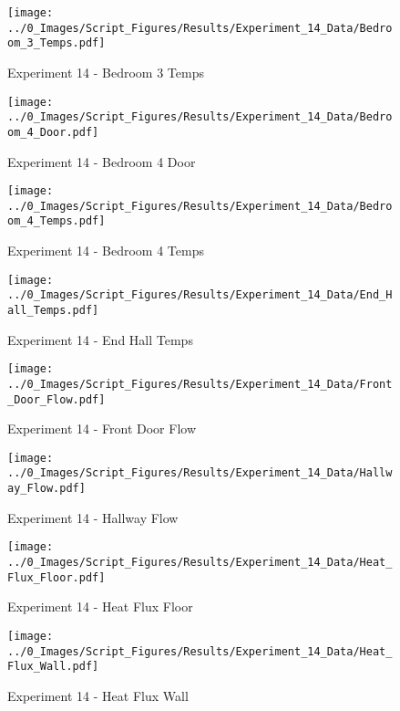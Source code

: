 	\begin{figure}[H]
		\centering
		\texttt{[image: ../0\_Images/Script\_Figures/Results/Experiment\_14\_Data/Bedroom\_3\_Temps.pdf]}
		\caption[]{Experiment 14 - Bedroom 3 Temps}
	\end{figure}
 
	\clearpage

	\begin{figure}[H]
		\centering
		\texttt{[image: ../0\_Images/Script\_Figures/Results/Experiment\_14\_Data/Bedroom\_4\_Door.pdf]}
		\caption[]{Experiment 14 - Bedroom 4 Door}
	\end{figure}
 

	\begin{figure}[H]
		\centering
		\texttt{[image: ../0\_Images/Script\_Figures/Results/Experiment\_14\_Data/Bedroom\_4\_Temps.pdf]}
		\caption[]{Experiment 14 - Bedroom 4 Temps}
	\end{figure}
 
	\clearpage

	\begin{figure}[H]
		\centering
		\texttt{[image: ../0\_Images/Script\_Figures/Results/Experiment\_14\_Data/End\_Hall\_Temps.pdf]}
		\caption[]{Experiment 14 - End Hall Temps}
	\end{figure}
 

	\begin{figure}[H]
		\centering
		\texttt{[image: ../0\_Images/Script\_Figures/Results/Experiment\_14\_Data/Front\_Door\_Flow.pdf]}
		\caption[]{Experiment 14 - Front Door Flow}
	\end{figure}
 
	\clearpage

	\begin{figure}[H]
		\centering
		\texttt{[image: ../0\_Images/Script\_Figures/Results/Experiment\_14\_Data/Hallway\_Flow.pdf]}
		\caption[]{Experiment 14 - Hallway Flow}
	\end{figure}
 

	\begin{figure}[H]
		\centering
		\texttt{[image: ../0\_Images/Script\_Figures/Results/Experiment\_14\_Data/Heat\_Flux\_Floor.pdf]}
		\caption[]{Experiment 14 - Heat Flux Floor}
	\end{figure}
 
	\clearpage

	\begin{figure}[H]
		\centering
		\texttt{[image: ../0\_Images/Script\_Figures/Results/Experiment\_14\_Data/Heat\_Flux\_Wall.pdf]}
		\caption[]{Experiment 14 - Heat Flux Wall}
	\end{figure}
 

